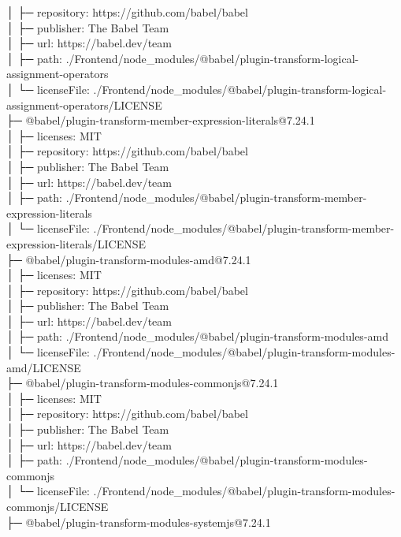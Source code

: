 \documentclass[
    paper=a4,
    twoside=false,
    parskip=half,
    listof=entryprefix,
    listof=totoc,
    index=totoc,
    bibliography=totoc,
    headsepline,
]{scrbook}
\begin{document}
    │  ├─ repository: https://github.com/babel/babel\\
    │  ├─ publisher: The Babel Team\\
    │  ├─ url: https://babel.dev/team\\
    │  ├─ path: ./Frontend/node\_modules/@babel/plugin-transform-logical-assignment-operators\\
    │  └─ licenseFile: ./Frontend/node\_modules/@babel/plugin-transform-logical-assignment-operators/LICENSE\\
    ├─ @babel/plugin-transform-member-expression-literals@7.24.1\\
    │  ├─ licenses: MIT\\
    │  ├─ repository: https://github.com/babel/babel\\
    │  ├─ publisher: The Babel Team\\
    │  ├─ url: https://babel.dev/team\\
    │  ├─ path: ./Frontend/node\_modules/@babel/plugin-transform-member-expression-literals\\
    │  └─ licenseFile: ./Frontend/node\_modules/@babel/plugin-transform-member-expression-literals/LICENSE\\
    ├─ @babel/plugin-transform-modules-amd@7.24.1\\
    │  ├─ licenses: MIT\\
    │  ├─ repository: https://github.com/babel/babel\\
    │  ├─ publisher: The Babel Team\\
    │  ├─ url: https://babel.dev/team\\
    │  ├─ path: ./Frontend/node\_modules/@babel/plugin-transform-modules-amd\\
    │  └─ licenseFile: ./Frontend/node\_modules/@babel/plugin-transform-modules-amd/LICENSE\\
    ├─ @babel/plugin-transform-modules-commonjs@7.24.1\\
    │  ├─ licenses: MIT\\
    │  ├─ repository: https://github.com/babel/babel\\
    │  ├─ publisher: The Babel Team\\
    │  ├─ url: https://babel.dev/team\\
    │  ├─ path: ./Frontend/node\_modules/@babel/plugin-transform-modules-commonjs\\
    │  └─ licenseFile: ./Frontend/node\_modules/@babel/plugin-transform-modules-commonjs/LICENSE\\
    ├─ @babel/plugin-transform-modules-systemjs@7.24.1\\
\end{document}
